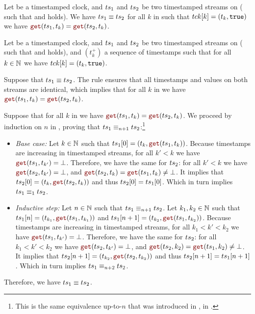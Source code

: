 \begin{lemma}
    \label{lem:semantics:grfrp:theorems:equivalence:getat}
    Let \tck be a timestamped clock, and $ts_1$ and $ts_2$ be two timestamped streams on \tck (\ie
    such that  and  holds). We have $ts_1 \equiv ts_2$ \iff for
    all $k$ in \N such that $tck[k] = (t_k, \mathtt{{true}})$ we have
    $\getAt{\ts_1}{t_k} = \getAt{\ts_2}{t_k}$.
\end{lemma}
\begin{skippableproof}
    Let \tck be a timestamped clock, and $ts_1$ and $ts_2$ be two timestamped streams on \tck (\ie
    such that  and  holds), and $(t_k^+)$ a sequence of timestamps such
    that for all $k \in \mathbb{N}$ we have $tck[k] = (t_k, \mathtt{{true}})$.

    Suppose that $ts_1 \equiv ts_2$. The rule  ensures that
    all timestamps and values on both streams are identical, which implies that for all $k$ in
    \N we have $\getAt{\ts_1}{t_k} = \getAt{\ts_2}{t_k}$.

    Suppose that for all $k$ in \N we have $\getAt{\ts_1}{t_k} = \getAt{\ts_2}{t_k}$. We proceed by
    induction on $n$ in \N, proving that $ts_1 \equiv_{n+1} ts_2$:\footnote{This is the same
        equivalence up-to-$n$ that was introduced in
        , in
        .}
    \begin{itemize}
        \item \textit{Base case:} Let $k \in \mathbb{N}$ such that
              $\ts_1[0] = (t_k, \getAt{\ts_1}{t_k})$. Because timestamps are increasing in
              timestamped streams, for all $k' < k$ we have $\getAt{\ts_1}{t_{k'}} = \bot$.
              Therefore, we have the same for $ts_2$: for all $k' < k$ we have
              $\getAt{\ts_2}{t_{k'}} = \bot$, and
              $\getAt{\ts_2}{t_k} = \getAt{\ts_1}{t_k} \neq \bot$. It implies that
              $\ts_2[0] = (t_k, \getAt{\ts_2}{t_k})$ and thus $ts_2[0] = ts_1[0]$.
              Which in turn implies $ts_1 \equiv_1 ts_2$.

        \item \textit{Inductive step:} Let $n \in \mathbb{N}$ such that $ts_1 \equiv_{n+1} ts_2$.
              Let $k_1, k_2 \in \mathbb{N}$ such that
              $\ts_1[n] = (t_{k_1}, \getAt{\ts_1}{t_{k_1}})$ and
              $\ts_1[n+1] = (t_{k_2}, \getAt{\ts_1}{t_{k_2}})$.
              Because timestamps are increasing in timestamped streams, for all $k_1 < k' < k_2$ we
              have $\getAt{\ts_1}{t_{k'}} = \bot$. Therefore, we have the same for $ts_2$: for all
              $k_1 < k' < k_2$ we have $\getAt{\ts_2}{t_{k'}} = \bot$, and
              $\getAt{\ts_2}{k_2} = \getAt{\ts_1}{k_2} \neq \bot$. It implies that
              $\ts_2[n+1] = (t_{k_2}, \getAt{\ts_2}{t_{k_2}})$ and thus $ts_2[n+1] = ts_1[n+1]$.
              Which in turn implies $ts_1 \equiv_{n+2} ts_2$.
    \end{itemize}
    Therefore, we have $ts_1 \equiv ts_2$.
\end{skippableproof}

